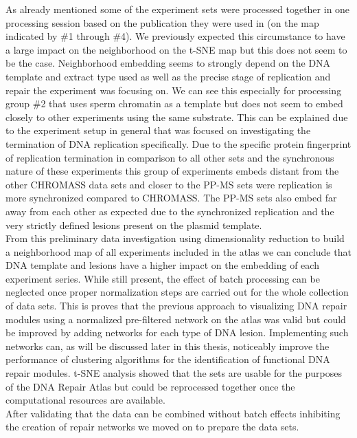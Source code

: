 As already mentioned some of the experiment sets were processed together in one processing session based on the publication they were used in (on the map indicated by \#1 through \#4). We previously expected this circumstance to have a large impact on the neighborhood on the t-SNE map but this does not seem to be the case. Neighborhood embedding seems to strongly depend on the DNA template and extract type used as well as the precise stage of replication and repair the experiment was focusing on. We can see this especially for processing group \#2 that uses sperm chromatin as a template but does not seem to embed closely to other experiments using the same substrate. This can be explained due to the experiment setup in general that was focused on investigating the termination of DNA replication specifically.  Due to the specific protein fingerprint of replication termination in comparison to all other sets and the synchronous nature of these experiments this group of experiments embeds distant from the other CHROMASS data sets and closer to the PP-MS sets were replication is more synchronized compared to CHROMASS. The PP-MS sets also embed far away from each other as expected due to the synchronized replication and the very strictly defined lesions present on the plasmid template.\\
From this preliminary data investigation using dimensionality reduction to build a neighborhood map of all experiments included in the atlas we can conclude that DNA template and lesions have a higher impact on the embedding of each experiment series. While still present, the effect of batch processing can be neglected once proper normalization steps are carried out for the whole collection of data sets. This is proves that the previous approach to visualizing DNA repair modules using a normalized pre-filtered network on the atlas was valid but could be improved by adding networks for each type of DNA lesion. Implementing such networks can, as will be discussed later in this thesis, noticeably improve the performance of clustering algorithms for the identification of functional DNA repair modules. t-SNE analysis showed that the sets are usable for the purposes of the DNA Repair Atlas but could be reprocessed together once the computational resources are available.\\
After validating that the data can be combined without batch effects inhibiting the creation of repair networks we moved on to prepare the data sets.\\\\
